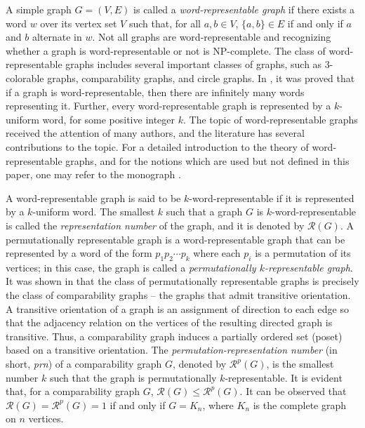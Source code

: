 \documentclass{llncs}
\begin{document}
A simple graph $G = (V, E)$ is called a \textit{word-representable graph} if there exists a word $w$ over its vertex set $V$ such that, for all $a,b \in V$, $\{a, b\} \in E$ if and only if $a$
and $b$ alternate in $w$. Not all graphs are word-representable and recognizing whether a graph is word-representable or not is NP-complete. The class of word-representable graphs includes several important classes of graphs, such as 3-colorable graphs, comparability graphs, and circle graphs. In \cite{kitaev08}, it was proved that if a graph is word-representable, then there are infinitely many words representing it.  Further, every word-representable graph is represented by a $k$-uniform word, for some positive integer $k$. The topic of word-representable graphs received the attention of many authors, and the literature has several contributions to the topic. For a detailed introduction to the theory of word-representable graphs, and for the notions which are used but not defined in this paper, one may refer to the monograph \cite{kitaev15mono}.

A word-representable graph is said to be $k$-word-representable if it is represented by a $k$-uniform word. The smallest $k$ such that a graph $G$ is $k$-word-representable is called the \textit{representation number} of the graph, and it is denoted by $\mathcal{R}(G)$. 
A permutationally representable graph is a word-representable graph that can be represented by a word of the form $p_1p_2\cdots p_k$ where each $p_i$ is a permutation of its vertices; in this case, the graph is called a \textit{permutationally $k$-representable graph}. It was shown in \cite{kitaev08order} that the class of permutationally representable graphs is precisely the class of comparability graphs -- the graphs that admit transitive orientation. A transitive orientation of a graph is an assignment of direction to each edge so that the adjacency relation on the vertices of the resulting directed graph is transitive. Thus, a comparability graph induces a partially ordered set (poset) based on a transitive orientation. The \textit{permutation-representation number} (in short, \textit{prn}) of a comparability graph $G$, denoted by $\mathcal{R}^p(G)$, is the smallest number $k$ such that the graph is permutationally $k$-representable. It is evident that, for a comparability graph $G$, $\mathcal{R}(G) \le \mathcal{R}^p(G)$. It can be observed that $\mathcal{R}(G) = \mathcal{R}^p(G) = 1$ if and only if $G = K_n$, where $K_n$ is the complete graph on $n$ vertices.
\end{document}
